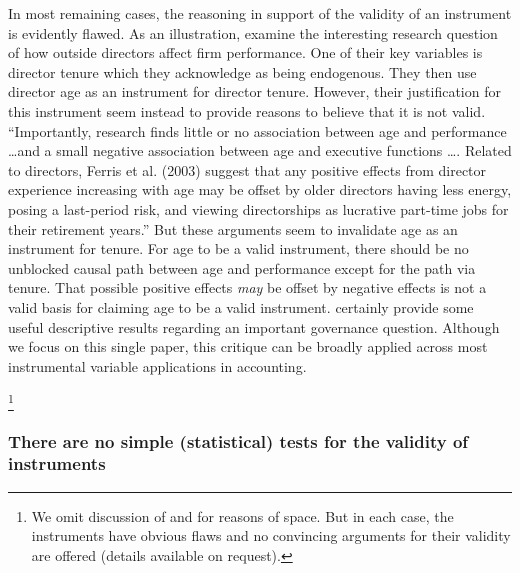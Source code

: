 \documentclass[12pt,reqno,titlepage]{amsart}
\begin{document}
\begin{doublespace}
In most remaining cases, the reasoning in support of the validity of an instrument is evidently flawed. 
As an illustration, \citet{Kim:2014fm} examine the interesting research question of how outside directors affect firm performance. One of their key variables is director tenure which they acknowledge as being endogenous. They then use director age as an instrument for director tenure. However, their justification for this instrument seem instead to provide reasons to believe that it is not valid. 
``Importantly, research finds little or no association between age and performance \dots and a small negative association between age and executive functions \dots. 
Related to directors, Ferris et al. (2003) suggest that any positive effects from director experience increasing with age may be offset by older directors having less energy, posing a last-period risk, and viewing directorships as lucrative part-time jobs for their retirement years.'' 
But these arguments seem to invalidate age as an instrument for tenure. 
For age to be a valid instrument, there should be no unblocked causal path between age and performance except for the path via tenure.
That possible positive effects \emph{may} be offset by negative effects is not a valid basis for claiming age to be a valid instrument.  \citet{:2014fm} certainly provide some useful descriptive results regarding an important governance question.  Although we focus on this single paper, this critique can be broadly applied across most instrumental variable applications in accounting.  

\footnote{We omit discussion of  \citet{Erkens:2014hj,Houston:2014hv} and \citet{deFranco:2014ct} for reasons of space. But in each case, the instruments have obvious flaws and no convincing arguments for their validity are offered (details available on request).}

\subsubsection{There are no simple (statistical) tests for the validity of instruments}


\end{doublespace}
\end{document}
